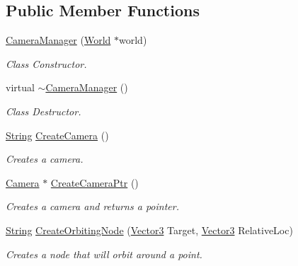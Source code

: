 \subsection*{Public Member Functions}
\begin{DoxyCompactItemize}
\item 
\hyperlink{classphys_1_1CameraManager_a22d9c117e4f7f7e8d043a9d13070391c}{CameraManager} (\hyperlink{classphys_1_1World}{World} $\ast$world)
\begin{DoxyCompactList}\small\item\em Class Constructor. \item\end{DoxyCompactList}\item 
virtual \hyperlink{classphys_1_1CameraManager_a0b0f032477309eb47b0302fd5eef198c}{$\sim$CameraManager} ()
\begin{DoxyCompactList}\small\item\em Class Destructor. \item\end{DoxyCompactList}\item 
\hyperlink{namespacephys_aa03900411993de7fbfec4789bc1d392e}{String} \hyperlink{classphys_1_1CameraManager_ac6ff80c91fa5a2cd21ebd8b78db9add2}{CreateCamera} ()
\begin{DoxyCompactList}\small\item\em Creates a camera. \item\end{DoxyCompactList}\item 
\hyperlink{classphys_1_1Camera}{Camera} $\ast$ \hyperlink{classphys_1_1CameraManager_ae51f79b63b5c34959bc4cfbef34b8f08}{CreateCameraPtr} ()
\begin{DoxyCompactList}\small\item\em Creates a camera and returns a pointer. \item\end{DoxyCompactList}\item 
\hyperlink{namespacephys_aa03900411993de7fbfec4789bc1d392e}{String} \hyperlink{classphys_1_1CameraManager_a9a696ea09f174a69bbc6d0bb179b3de4}{CreateOrbitingNode} (\hyperlink{classphys_1_1Vector3}{Vector3} Target, \hyperlink{classphys_1_1Vector3}{Vector3} RelativeLoc)
\begin{DoxyCompactList}\small\item\em Creates a node that will orbit around a point. \item\end{DoxyCompactList}\item 

\end{DoxyCompactItemize}
